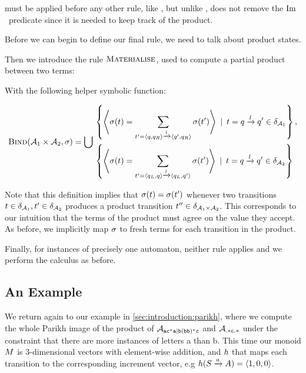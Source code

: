 \documentclass[acmsmall,review,anonymous,screen]{acmart}\settopmatter{printfolios=true,printccs=false,printacmref=true}
\theoremstyle{definition}
\begin{document}
\ExpandM{} must be applied before any other rule, like \Expand{}, but unlike \Expand{}, \ExpandM{} does not remove the $\operatorname{Im}$~predicate since it is needed to keep track of the product.

Before we can begin to define our final rule, we need to talk about product states.

Then we introduce the rule $\textsc{Materialise}$, used to compute a partial product between two terms:

  With the following helper symbolic function:

  $$
  \textsc{Bind}(\mathcal{A}_1 \times \mathcal{A}_2, \operatorname{\sigma}) = \bigcup
  \begin{aligned}
  & \left\{ 
    \left<\operatorname{\sigma}(t)  =  \sum\limits_{t' = \left\langle q, q_R\right\rangle \xrightarrow{l} \left\langle q', q_R\right\rangle} \operatorname{\sigma}(t')\right>
  \:\mid\: t = q \xrightarrow{l} q' \in \delta_{\mathcal{A}_1} \right\} , \\ 
  & \left\{
    \left<\operatorname{\sigma}(t)  =  \sum\limits_{t' = \left\langle q_L, q\right\rangle \xrightarrow{l} \left\langle q_L, q'\right\rangle} \operatorname{\sigma}(t')\right> \:\mid\: t = q \xrightarrow{l} q' \in \delta_{\mathcal{A}_2}
  \right\}
  \end{aligned}
$$

Note that this definition implies that $\operatorname{\sigma}(t) =
\operatorname{\sigma}(t')$ whenever two transitions $t \in
\delta_{\mathcal{A}_1}, t' \in \delta_{\mathcal{A}_2}$
produces a product transition $t'' \in \delta_{\mathcal{A}_1
\times \mathcal{A}_2}$. This corresponds to our intuition that the terms of the
product must agree on the value they accept. As before, we implicitly map
$\operatorname{\sigma}$ to fresh terms for each transition in the product.

Finally, for instances of precisely one automaton, neither rule applies and we
perform the calculus as before.

\subsection{An Example}\label{sec:multiple:example}

We return again to our example in \cref{sec:introduction:parikh}, where we
compute the whole Parikh image of the product of $\mathcal{A}_{\mathtt{ac^*a|b(bb)^*c}}{}$ and
$\mathcal{A}_{\mathtt{.*c.*}}$ under the constraint that there are more instances of
letters a than b. This time our monoid $M$ is 3-dimensional vectors with
element-wise addition, and $h$ that maps each transition to the corresponding
increment vector, e.g $h(S \xrightarrow{a} A) = \left\langle1,0,0\right\rangle$.
\end{document}
